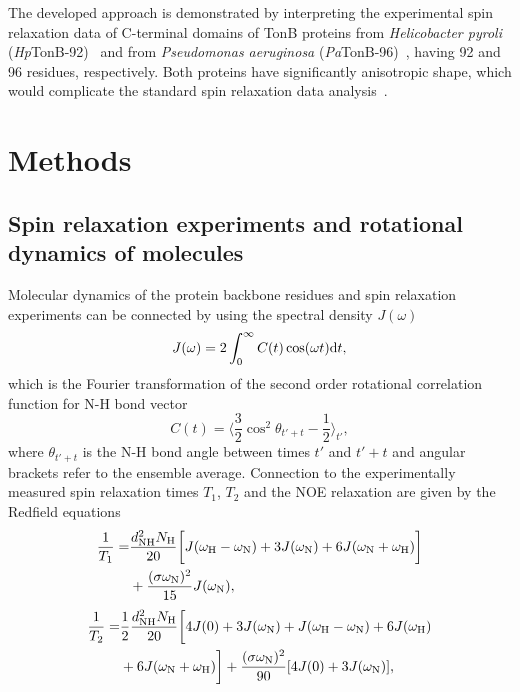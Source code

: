\documentclass[journal=jpcbfk,manuscript=article]{achemso}
\begin{document}
The developed approach is demonstrated by interpreting the experimental spin relaxation data 
of C-terminal domains of TonB proteins from {\it Helicobacter pyroli} ({\it Hp}TonB-92)~\cite{ciragan16}
and from {\it Pseudomonas aeruginosa} ({\it Pa}TonB-96)~\cite{oeemig17}, having
92 and 96 residues, respectively. Both proteins have significantly
anisotropic shape, which would complicate the standard spin relaxation data
analysis~\cite{woessner62,shimizu62,jarymowycz06,korzhnev01,luginbuhl97,hall04}.


\section{Methods}

\subsection{Spin relaxation experiments and rotational dynamics of molecules}
Molecular dynamics of the protein backbone residues and spin relaxation experiments can
be connected by using the spectral density $J(\omega)$ 
\begin{equation}\label{SPECTdens}
  J(\omega)=2\int_0^\infty C(t) \cos(\omega t) {\rm d}t,
\end{equation}
which is the Fourier transformation of the second order
rotational correlation function for N-H bond vector
\begin{equation}\label{CORRFdef}
  C(t)=\langle \frac{3}{2}\cos^2\theta_{t'+t}-\frac{1}{2} \rangle_{t'},
\end{equation}
where $\theta_{t'+t}$ is the N-H bond angle between times $t'$ and $t'+t$
and angular brackets refer to the ensemble average.
Connection to the experimentally measured spin relaxation times $T_1$, $T_2$
and the NOE relaxation are given by the Redfield equations~\cite{abragam,kay89}
\begin{equation}\label{R1}
  \begin{aligned}
  \frac{1}{T_1}= & \frac{d_{\rm{NH}}^2N_{\rm{H}}}{20}\bigg[J(\omega_{\rm{H}}-\omega_{\rm{N}})+3J(\omega_{\rm{N}})+6J(\omega_{\rm{N}}+\omega_{\rm{H}})\bigg] \\
        & +\frac{(\sigma \omega_{\rm{N}})^2}{15}J(\omega_{\rm{N}}),
  \end{aligned}
\end{equation}
\begin{equation}\label{R2}
    \begin{aligned}
  \frac{1}{T_2}= & \frac{1}{2}\frac{d_{\rm{NH}}^2N_{\rm{H}}}{20}\bigg[4J(0)+3J(\omega_{\rm{N}})+J(\omega_{\rm{H}}-\omega_{\rm{N}})+6J(\omega_{\rm{H}})  \\
    & +6J(\omega_{\rm{N}}+\omega_{\rm{H}})\bigg]+\frac{(\sigma \omega_{\rm{N}})^2}{90}[4J(0) +3J(\omega_{\rm{N}})],
    \end{aligned}
\end{equation}
\end{document}
